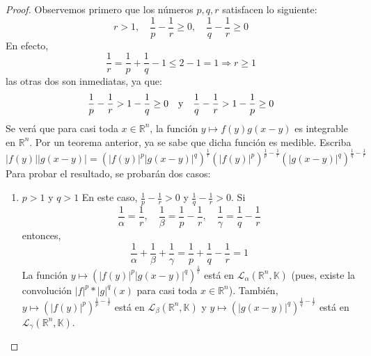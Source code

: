 \documentclass[12pt]{report}
\theoremstyle{largebreak}
\newcommand\abs[1]{\ensuremath{\big|#1\big|}}
\begin{document}
    \begin{proof}
        Observemos primero que los números $p,q,r$ satisfacen lo siguiente:
        \begin{equation*}
            r>1,\quad\frac{1}{p}-\frac{1}{r}\geq 0,\quad\frac{1}{q}-\frac{1}{r}\geq0
        \end{equation*}
        En efecto,
        \begin{equation*}
            \frac{1}{r}=\frac{1}{p}+\frac{1}{q}-1\leq 2-1=1\Rightarrow r\geq 1
        \end{equation*}
        las otras dos son inmediatas, ya que:
        \begin{equation*}
            \frac{1}{p}-\frac{1}{r}>1-\frac{1}{q}\geq0\quad\textup{y}\quad \frac{1}{q}-\frac{1}{r}>1-\frac{1}{p}\geq0
        \end{equation*}
        Se verá que para casi toda $x\in\mathbb{R}^n$, la función $y\mapsto f(y)g(x-y)$ es integrable en $\mathbb{R}^n$. Por un teorema anterior, ya se sabe que dicha función es medible.
        Escriba
        \begin{equation*}
            \abs{f(y)}\abs{g(x-y)}=\left(\abs{f(y)}^p\abs{g(x-y)}^q\right)^{\frac{1}{r}}\left(\abs{f(y)}^p \right)^{\frac{1}{p}-\frac{1}{r}}\left(\abs{g(x-y)}^q \right)^{\frac{1}{q}-\frac{1}{r}}
        \end{equation*}
        Para probar el resultado, se probarán dos casos:
        \begin{enumerate}
            \item $p>1$ y $q>1$ En este caso, $\frac{1}{p}-\frac{1}{r}>0$ y $\frac{1}{q}-\frac{1}{r}>0$. Si
            \begin{equation*}
                \frac{1}{\alpha}=\frac{1}{r},\quad \frac{1}{\beta}=\frac{1}{p}-\frac{1}{r},\quad \frac{1}{\gamma}=\frac{1}{q}-\frac{1}{r}
            \end{equation*}
            entonces,
            \begin{equation*}
                \frac{1}{\alpha}+\frac{1}{\beta}+\frac{1}{\gamma}=\frac{1}{p}+\frac{1}{q}-\frac{1}{r}=1
            \end{equation*}
            La función $y\mapsto \left(\abs{f(y)}^p\abs{g(x-y)}^q\right)^{\frac{1}{r}}$ está en $\mathcal{L}_\alpha(\mathbb{R}^n,\mathbb{K})$ (pues, existe la convolución $\abs{f}^p*\abs{g}^q(x)$ para casi toda $x\in\mathbb{R}^n$). También, $y\mapsto \left(\abs{f(y)}^p \right)^{\frac{1}{p}-\frac{1}{r}}$ está en $\mathcal{L}_\beta(\mathbb{R}^n,\mathbb{K})$ y $y\mapsto \left(\abs{g(x-y)}^q \right)^{\frac{1}{q}-\frac{1}{r}}$ está en $\mathcal{L}_\gamma(\mathbb{R}^n,\mathbb{K})$.


\end{enumerate}
\end{proof}
\end{document}
